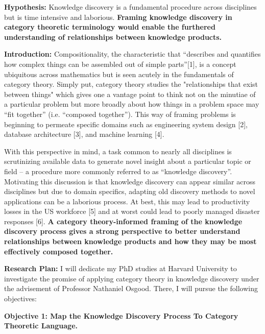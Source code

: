 \documentclass[11pt]{extarticle}
\begin{document}
\textbf{Hypothesis:} Knowledge discovery is a fundamental procedure across disciplines but is time intensive and laborious.
\textbf{Framing knowledge discovery in category theoretic terminology would enable the furthered understanding of relationships between knowledge products.}

\textbf{Introduction:} Compositionality, the characteristic that ``describes and quantifies how complex things can be assembled out of simple parts''[1], is a concept ubiquitous across mathematics but is seen acutely in the fundamentals of category theory.
Simply put, category theory studies the "relationships that exist between things" which gives one a vantage point to think not on the minutiae of a particular problem but more broadly about how things in a problem space may ``fit together'' (i.e. ``composed together'').
This way of framing problems is beginning to permeate specific domains such as engineering system design [2], database architecture [3], and machine learning [4]. 

With this perspective in mind, a task common to nearly all disciplines is scrutinizing available data to generate novel insight about a particular topic or field -- a procedure more commonly referred to as ``knowledge discovery''.
Motivating this discussion is that knowledge discovery can appear similar across disciplines but due to domain specifics, adapting old discovery methods to novel applications can be a laborious process. 
At best, this may lead to productivity losses in the US workforce [5] and at worst could lead to poorly managed disaster responses [6].
\textbf{A category theory-informed framing of the knowledge discovery process gives a strong perspective to better understand relationships between knowledge products and how they may be most effectively composed together.}

\textbf{Research Plan:} I will dedicate my PhD studies at Harvard University to investigate the promise of applying category theory in knowledge discovery under the advisement of Professor Nathaniel Osgood.
There, I will pursue the following objectives:

\textbf{Objective 1: Map the Knowledge Discovery Process To Category Theoretic Language.}
\end{document}
